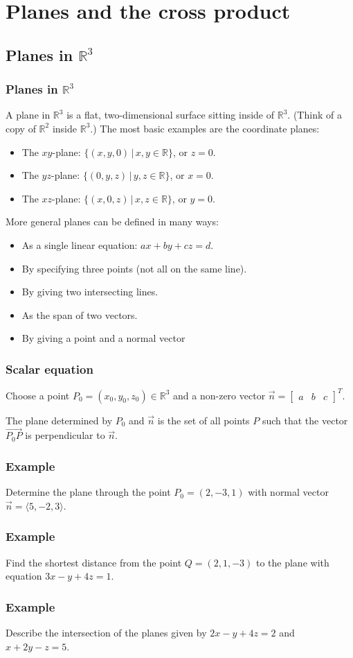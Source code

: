 \documentclass[11pt,t]{beamer}
\newcommand{\R}{\mathbb{R}}
\begin{document}
\section{Planes and the cross product}
\subsection{Planes in $\R^3$}
\begin{frame}\frametitle{Planes in $\R^3$}
 A \alert{plane} in $\R^3$ is a flat, two-dimensional surface sitting inside of $\R^3$. (Think of a copy of $\R^2$ inside $\R^3$.) The most basic examples are the \alert{coordinate planes}:
\begin{itemize}
 \item The $xy$-plane: $\{(x,y,0)\,|\,x,y\in\R\}$, or $z=0$.
 \item The $yz$-plane: $\{(0,y,z)\,|\,y,z\in\R\}$, or $x=0$.
 \item The $xz$-plane: $\{(x,0,z)\,|\,x,z\in\R\}$, or $y=0$.
\end{itemize}
More general planes can be defined in many ways:
\begin{itemize}
 \item As a single linear equation: $ax+by+cz=d$.
 \item By specifying three points (not all on the same line).
 \item By giving two intersecting lines.
 \item As the \alert{span} of two vectors.
 \item By giving a point and a \alert{normal vector}
\end{itemize}
\end{frame}
\begin{frame}\frametitle{Scalar equation}
 Choose a point $P_0=(x_0,y_0,z_0)\in\R^3$ and a non-zero vector $\vec{n} = \begin{bmatrix}a&b&c\end{bmatrix}^T$.

 The \alert{plane} determined by $P_0$ and $\vec{n}$ is the set of all points $P$ such that the vector $\overrightarrow{P_0P}$ is \alert{perpendicular} to $\vec{n}$.
\end{frame}
\begin{frame}\frametitle{Example}
 Determine the plane through the point $P_0=(2,-3,1)$ with normal vector $\vec{n}=\langle 5,-2,3\rangle$.
\end{frame}
\begin{frame}\frametitle{Example}
 Find the shortest distance from the point $Q=(2,1,-3)$ to the plane with equation $3x-y+4z=1$.
\end{frame}
\begin{frame}\frametitle{Example}
 Describe the intersection of the planes given by $2x-y+4z=2$ and $x+2y-z=5$.
\end{frame}
\end{document}
